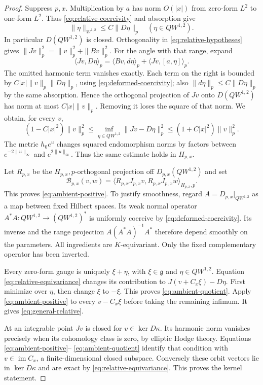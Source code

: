 \documentclass[11pt]{amsart}
\theoremstyle{definition}
\theoremstyle{remark}
\newcommand{\im}{\operatorname{im}}
\begin{document}
\begin{proof}
Suppress $p,x$. Multiplication by $a$ has norm $O(|x|)$ from
zero-form $L^2$ to one-form $L^2$. Thus \eqref{eq:relative-coercivity}
and absorption give
\begin{equation}\label{eq:deformed-coercivity}
 \|\eta\|_{W^{1,2}}\le C\|D\eta\|_p
 \quad(\eta\in QW^{1,2}).
\end{equation}
In particular $D(QW^{1,2})$ is closed. Orthogonality in
\eqref{eq:relative-hypotheses} gives
$\|Jv\|_p^2=\|v\|_p^2+\|Bv\|_p^2$.
For the angle with that range, expand
\[
 \langle Jv,D\eta\rangle_p
 =\langle Bv,d\eta\rangle_p+
   \langle Jv,[a,\eta]\rangle_p.
\]
The omitted harmonic term vanishes exactly. Each term on the right
is bounded by $C|x|\|v\|_p\|D\eta\|_p$, using
\eqref{eq:deformed-coercivity}; also
$\|d\eta\|_p\le C\|D\eta\|_p$ by the same absorption.
Hence the orthogonal projection of $Jv$ onto $D(QW^{1,2})$ has
norm at most $C|x|\|v\|_p$. Removing it loses the square of that
norm. We obtain, for every $v$,
\begin{equation}\label{eq:before-minimization}
 (1-C|x|^2)\|v\|_p^2
 \le\inf_{\eta\in QW^{1,2}}\|Jv-D\eta\|_p^2
 \le(1+C|x|^2)\|v\|_p^2.
\end{equation}
The metric $h_0e^u$ changes squared endomorphism norms by factors
between $e^{-2\|u\|_\infty}$ and $e^{2\|u\|_\infty}$.
Thus the same estimate holds in $H_{p,x}$.

Let $R_{p,x}$ be the $H_{p,x},p$-orthogonal projection off
$D_{p,x}(QW^{1,2})$ and set
\[
 \mathcal B_{p,x}(v,w)=
 \langle R_{p,x}J_{p,x}v,R_{p,x}J_{p,x}w\rangle_{H_{p,x},p}.
\]
This proves \eqref{eq:ambient-positive}. To justify smoothness, regard
$A=D_{p,x}|_{QW^{1,2}}$ as a map between fixed Hilbert spaces.
Its weak normal operator $A^*A:QW^{1,2}\to(QW^{1,2})^*$ is
uniformly coercive by \eqref{eq:deformed-coercivity}. Its inverse
and the range projection $A(A^*A)^{-1}A^*$ therefore depend smoothly
on the parameters. All ingredients are $K$-equivariant.
Only the fixed complementary operator has been inverted.

Every zero-form gauge is uniquely $\xi+\eta$, with
$\xi\in\mathfrak g$ and $\eta\in QW^{1,2}$. Equation
\eqref{eq:relative-equivariance} changes its contribution to
$J(v+C_x\xi)-D\eta$. First minimize over $\eta$, then change
$\xi$ to $-\xi$. This proves \eqref{eq:ambient-quotient}.
Apply \eqref{eq:ambient-positive} to every $v-C_x\xi$ before
taking the remaining infimum. It gives \eqref{eq:general-relative}.

At an integrable point $Jv$ is closed for $v\in\ker D\kappa$.
Its harmonic norm vanishes precisely when its cohomology class is zero,
by elliptic Hodge theory. Equations \eqref{eq:ambient-positive}--
\eqref{eq:ambient-quotient} identify that condition with
$v\in\im C_x$, a finite-dimensional closed subspace. Conversely
these orbit vectors lie in $\ker D\kappa$ and are exact by
\eqref{eq:relative-equivariance}. This proves the kernel statement.
\end{proof}
\end{document}
